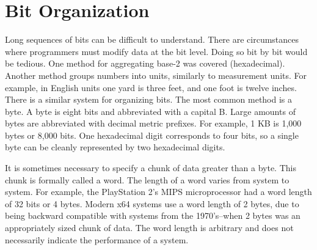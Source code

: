 \begin{figure}[h]
\end{figure}

\section{Bit Organization\label{sec:data:bits}}

Long sequences of bits can be difficult to understand. There are circumstances where programmers must 
modify data at the bit level. Doing so bit by bit would be tedious. One method for aggregating \gls{base-2} was covered (hexadecimal). 
Another method groups numbers into units, similarly to measurement units. For example, in English units one yard is 
three feet, and one foot is twelve inches. There is a similar system for organizing bits. The most common method is 
a byte. A byte is eight bits and abbreviated with a capital B. Large amounts of bytes are abbreviated with decimal metric prefixes. For 
example, 1 KB is 1,000 bytes or 8,000 bits. One hexadecimal digit corresponds to four bits, so a single byte can
be cleanly represented by two hexadecimal digits.

It is sometimes necessary to specify a chunk of data greater than a byte. This chunk is formally called a word. The 
length of a word varies from system to system. For example, the PlayStation 2's MIPS microprocessor had a word length of 
32 bits or 4 bytes. Modern \gls{x64} systems use a word length of 2 bytes, due to being backward compatible with systems 
from the 1970's--when 2 bytes was an appropriately sized chunk of data. The word length is arbitrary and does not necessarily
indicate the performance of a system.